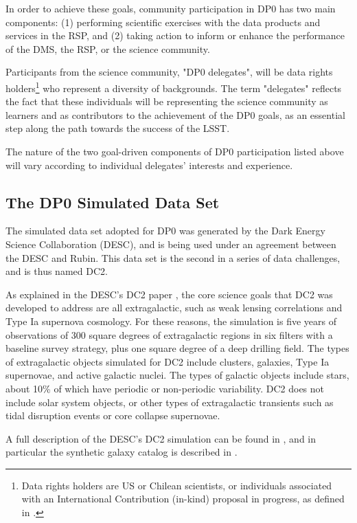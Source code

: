 \documentclass[DM,lsstdraft,authoryear,toc]{lsstdoc}
\begin{document}
In order to achieve these goals, community participation in DP0 has two main components:
(1) performing scientific exercises with the data products and services in the RSP, and
(2) taking action to inform or enhance the performance of the DMS, the RSP, or the science community.

Participants from the science community, "DP0 delegates", will be data rights holders\footnote{Data rights holders are US or Chilean scientists, or individuals associated with an International Contribution (in-kind) proposal in progress, as defined in .} who represent a diversity of backgrounds.
The term "delegates" reflects the fact that these individuals will be representing the science community as learners and as contributors to the achievement of the DP0 goals, as an essential step along the path towards the success of the LSST. 

The nature of the two goal-driven components of DP0 participation listed above will vary according to individual delegates' interests and experience.

\subsection{The DP0 Simulated Data Set}\label{ssec:intro_dc2}

The simulated data set adopted for DP0 was generated by the Dark Energy Science Collaboration (DESC), and is being used under an agreement between the DESC and Rubin.
This data set is the second in a series of data challenges, and is thus named DC2.

As explained in the DESC's DC2 paper \citep{2020arXiv201005926L}, the core science goals that DC2 was developed to address are all extragalactic, such as weak lensing correlations and Type Ia supernova cosmology.
For these reasons, the simulation is five years of observations of 300 square degrees of extragalactic regions in six filters with a baseline survey strategy, plus one square degree of a deep drilling field.
The types of extragalactic objects simulated for DC2 include clusters, galaxies, Type Ia supernovae, and active galactic nuclei.
The types of galactic objects include stars, about 10\% of which have periodic or non-periodic variability.
DC2 does not include solar system objects, or other types of extragalactic transients such as tidal disruption events or core collapse supernovae.

A full description of the DESC's DC2 simulation can be found in \citep{2020arXiv201005926L}, and in particular the synthetic galaxy catalog is described in \citet{2019ApJS..245...26K}.
\end{document}
